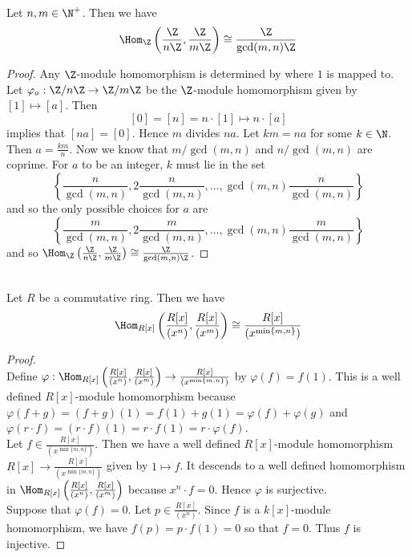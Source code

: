 \documentclass[a4paper]{article}
\begin{document}
\begin{eg}{}{}\\
Let $n,m\in\N^+$. Then we have $$\Hom_\Z\left(\frac{\Z}{n\Z},\frac{\Z}{m\Z}\right)\cong\frac{\Z}{\gcd(m,n)\Z}$$ 
\begin{proof}
Any $\Z$-module homomorphism is determined by where $1$ is mapped to. Let $\varphi_a:\Z/n\Z\to\Z/m\Z$ be the $\Z$-module homomorphism given by $[1]\mapsto[a]$. Then $$[0]=[n]=n\cdot[1]\mapsto n\cdot[a]$$ implies that $[na]=[0]$. Hence $m$ divides $na$. Let $km=na$ for some $k\in\N$. Then $a=\frac{km}{n}$. Now we know that $m/\gcd(m,n)$ and $n/\gcd(m,n)$ are coprime. For $a$ to be an integer, $k$ must lie in the set $$\left\{\frac{n}{\gcd(m,n)},2\frac{n}{\gcd(m,n)},\dots,\gcd(m,n)\frac{n}{\gcd(m,n)}\right\}$$ and so the only possible choices for $a$ are $$\left\{\frac{m}{\gcd(m,n)},2\frac{m}{\gcd(m,n)},\dots,\gcd(m,n)\frac{m}{\gcd(m,n)}\right\}$$ and so $\Hom_\Z\left(\frac{\Z}{n\Z},\frac{\Z}{m\Z}\right)\cong\frac{\Z}{\gcd(m,n)\Z}$. 
\end{proof}
\end{eg}

\begin{eg}{}{}\\
Let $R$ be a commutative ring. Then we have $$\Hom_{R[x]}\left(\frac{R[x]}{(x^n)},\frac{R[x]}{(x^m)}\right)\cong\frac{R[x]}{(x^{\min\{m,n\}})}$$
\begin{proof}\\
Define $\varphi:\Hom_{R[x]}\left(\frac{R[x]}{(x^n)},\frac{R[x]}{(x^m)}\right)\to\frac{R[x]}{(x^{\min\{m,n\}})}$ by $\varphi(f)=f(1)$. This is a well defined $R[x]$-module homomorphism because $\varphi(f+g)=(f+g)(1)=f(1)+g(1)=\varphi(f)+\varphi(g)$ and $\varphi(r\cdot f)=(r\cdot f)(1)=r\cdot f(1)=r\cdot\varphi(f)$. \\

Let $f\in\frac{R[x]}{(x^{\min\{m,n\}})}$. Then we have a well defined $R[x]$-module homomorphism $R[x]\to\frac{R[x]}{(x^{\min\{m,n\}})}$ given by $1\mapsto f$. It descends to a well defined homomorphism in $\Hom_{R[x]}\left(\frac{R[x]}{(x^n)},\frac{R[x]}{(x^m)}\right)$ because $x^n\cdot f=0$. Hence $\varphi$ is surjective. \\

Suppose that $\varphi(f)=0$. Let $p\in\frac{R[x]}{(x^n)}$. Since $f$ is a $k[x]$-module homomorphism, we have $f(p)=p\cdot f(1)=0$ so that $f=0$. Thus $f$ is injective. 
\end{proof}
\end{eg}
\end{document}
